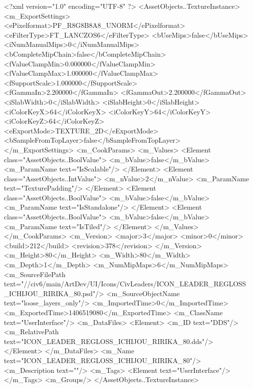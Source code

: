 <?xml version="1.0" encoding="UTF-8" ?>
<AssetObjects..TextureInstance>
	<m_ExportSettings>
		<ePixelformat>PF_R8G8B8A8_UNORM</ePixelformat>
		<eFilterType>FT_LANCZOS6</eFilterType>
		<bUseMips>false</bUseMips>
		<iNumManualMips>0</iNumManualMips>
		<bCompleteMipChain>false</bCompleteMipChain>
		<fValueClampMin>0.000000</fValueClampMin>
		<fValueClampMax>1.000000</fValueClampMax>
		<fSupportScale>1.000000</fSupportScale>
		<fGammaIn>2.200000</fGammaIn>
		<fGammaOut>2.200000</fGammaOut>
		<iSlabWidth>0</iSlabWidth>
		<iSlabHeight>0</iSlabHeight>
		<iColorKeyX>64</iColorKeyX>
		<iColorKeyY>64</iColorKeyY>
		<iColorKeyZ>64</iColorKeyZ>
		<eExportMode>TEXTURE_2D</eExportMode>
		<bSampleFromTopLayer>false</bSampleFromTopLayer>
	</m_ExportSettings>
	<m_CookParams>
		<m_Values>
			<Element class="AssetObjects..BoolValue">
				<m_bValue>false</m_bValue>
				<m_ParamName text="IsScalable"/>
			</Element>
			<Element class="AssetObjects..IntValue">
				<m_nValue>2</m_nValue>
				<m_ParamName text="TexturePadding"/>
			</Element>
			<Element class="AssetObjects..BoolValue">
				<m_bValue>false</m_bValue>
				<m_ParamName text="IsStandalone"/>
			</Element>
			<Element class="AssetObjects..BoolValue">
				<m_bValue>false</m_bValue>
				<m_ParamName text="IsTiled"/>
			</Element>
		</m_Values>
	</m_CookParams>
	<m_Version>
		<major>3</major>
		<minor>0</minor>
		<build>212</build>
		<revision>378</revision>
	</m_Version>
	<m_Height>80</m_Height>
	<m_Width>80</m_Width>
	<m_Depth>1</m_Depth>
	<m_NumMipMaps>6</m_NumMipMaps>
	<m_SourceFilePath text="//civ6/main/ArtDev/UI/Icons/CivLeaders/ICON_LEADER_REGLOSS_ICHIJOU_RIRIKA_80.psd"/>
	<m_SourceObjectName text="loose_layers_only"/>
	<m_ImportedTime>0</m_ImportedTime>
	<m_ExportedTime>1406519080</m_ExportedTime>
	<m_ClassName text="UserInterface"/>
	<m_DataFiles>
		<Element>
			<m_ID text="DDS"/>
			<m_RelativePath text="ICON_LEADER_REGLOSS_ICHIJOU_RIRIKA_80.dds"/>
		</Element>
	</m_DataFiles>
	<m_Name text="ICON_LEADER_REGLOSS_ICHIJOU_RIRIKA_80"/>
	<m_Description text=""/>
	<m_Tags>
		<Element text="UserInterface"/>
	</m_Tags>
	<m_Groups/>
</AssetObjects..TextureInstance>

